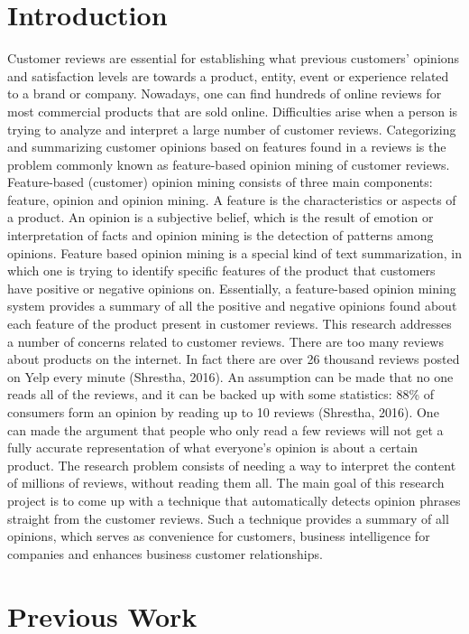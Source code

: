 \documentclass{sig-alternate}
\begin{document}
\section{Introduction}
Customer reviews are essential for establishing what previous customers' opinions and satisfaction levels are towards a product, entity, event or experience related to a brand or company. Nowadays, one can find hundreds of online reviews for most commercial products that are sold online. Difficulties arise when a person is trying to analyze and interpret a large number of customer reviews. Categorizing and summarizing customer opinions based on features found in a reviews is the problem commonly known as feature-based opinion mining of customer reviews. 
Feature-based (customer) opinion mining consists of three main components: feature, opinion and opinion mining. A feature is the characteristics or aspects of a product. An opinion is a subjective belief, which is the result of emotion or interpretation of facts and opinion mining is the detection of patterns among opinions. Feature based opinion mining is a special kind of text summarization, in which one is trying to identify specific features of the product that customers have positive or negative opinions on. Essentially, a feature-based opinion mining system provides a summary of all the positive and negative opinions found about each feature of the product present in customer reviews.
This research addresses a number of concerns related to customer reviews. There are too many reviews about products on the internet. In fact there are over 26 thousand reviews posted on Yelp every minute (Shrestha, 2016). An assumption can be made that no one reads all of the reviews, and it can be  backed up with some statistics: 88\% of consumers form an opinion by reading up to 10 reviews (Shrestha, 2016). One can made the argument that people who only read a few reviews will not get a fully accurate representation of what everyone's opinion is about a certain product. The research problem consists of needing a way to interpret the content of millions of reviews, without reading them all. The main goal of this research project is to come up with a technique that automatically detects opinion phrases straight from the customer reviews. Such a technique provides a summary of all opinions, which serves as convenience for customers, business intelligence for companies and enhances business customer relationships.

\section{Previous Work}
\end{document}
